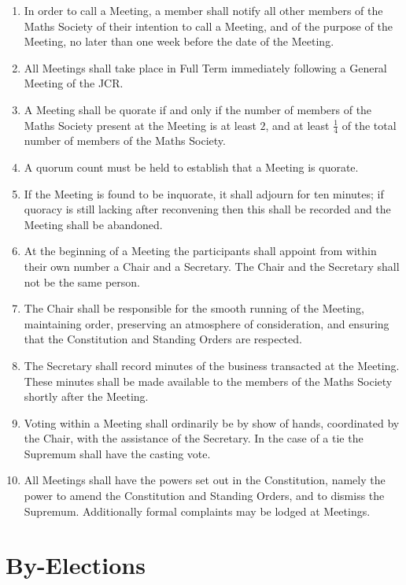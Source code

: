 \documentclass[pdftex,a4paper]{report}
\begin{document}
\begin{enumerate}[label=\Roman*)]
	\item In order to call a Meeting, a member shall notify all other members of the Maths Society of their intention to call a Meeting, and of the purpose of the Meeting, no later than one week before the date of the Meeting.
	\item All Meetings shall take place in Full Term immediately following a General Meeting of the JCR.
	\item A Meeting shall be quorate if and only if the number of members of the Maths Society present at the Meeting is at least $2$, and at least $\frac{1}{4}$ of the total number of members of the Maths Society.
	\item A quorum count must be held to establish that a Meeting is quorate.
	\item If the Meeting is found to be inquorate, it shall adjourn for ten minutes; if quoracy is still lacking after reconvening then this shall be recorded and the Meeting shall be abandoned.
	\item At the beginning of a Meeting the participants shall appoint from within their own number a Chair and a Secretary. The Chair and the Secretary shall not be the same person.
	\item The Chair shall be responsible for the smooth running of the Meeting, maintaining order, preserving an atmosphere of consideration, and ensuring that the Constitution and Standing Orders are respected.
	\item The Secretary shall record minutes of the business transacted at the Meeting. These minutes shall be made available to the members of the Maths Society shortly after the Meeting.
	\item Voting within a Meeting shall ordinarily be by show of hands, coordinated by the Chair, with the assistance of the Secretary. In the case of a tie the Supremum shall have the casting vote.
	\item All Meetings shall have the powers set out in the Constitution, namely the power to amend the Constitution and Standing Orders, and to dismiss the Supremum. Additionally formal complaints may be lodged at Meetings.
\end{enumerate}


\section*{By-Elections}
\end{document}

